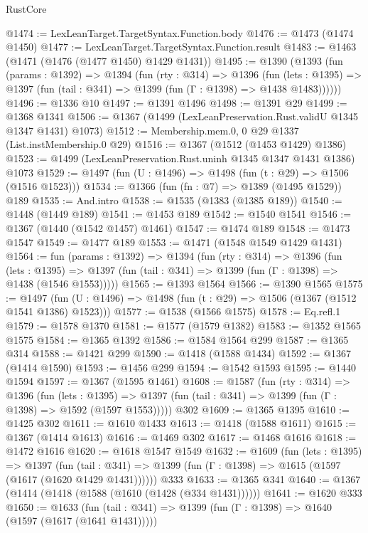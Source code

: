 \begin{lexlean}{RustCore}
\begin{coremodule}
@1474 := LexLeanTarget.TargetSyntax.Function.body
@1476 := @1473 (@1474 @1450)
@1477 := LexLeanTarget.TargetSyntax.Function.result
@1483 := @1463 (@1471 (@1476 (@1477 @1450) @1429 @1431))
@1495 := @1390
    (@1393
      (fun (params : @1392) =>
      @1394
        (fun (rty : @314) =>
        @1396
          (fun (lets : @1395) =>
          @1397 (fun (tail : @341) => @1399 (fun (Γ : @1398) => @1438 @1483))))))
@1496 := @1336 @10
@1497 := @1391 @1496
@1498 := @1391 @29
@1499 := @1368 @1341
@1506 := @1367 (@1499 (LexLeanPreservation.Rust.validU @1345 @1347 @1431) @1073)
@1512 := Membership.mem.{0, 0} @29 @1337 (List.instMembership.{0} @29)
@1516 := @1367 (@1512 (@1453 @1429) @1386)
@1523 := @1499 (LexLeanPreservation.Rust.uninh @1345 @1347 @1431 @1386) @1073
@1529 := @1497 (fun (U : @1496) => @1498 (fun (t : @29) => @1506 (@1516 @1523)))
@1534 := @1366 (fun (fn : @7) => @1389 (@1495 @1529)) @189
@1535 := And.intro
@1538 := @1535 (@1383 (@1385 @189))
@1540 := @1448 (@1449 @189)
@1541 := @1453 @189
@1542 := @1540 @1541
@1546 := @1367 (@1440 (@1542 @1457) @1461)
@1547 := @1474 @189
@1548 := @1473 @1547
@1549 := @1477 @189
@1553 := @1471 (@1548 @1549 @1429 @1431)
@1564 := fun (params : @1392) =>
  @1394
    (fun (rty : @314) =>
    @1396
      (fun (lets : @1395) =>
      @1397 (fun (tail : @341) => @1399 (fun (Γ : @1398) => @1438 (@1546 @1553)))))
@1565 := @1393 @1564
@1566 := @1390 @1565
@1575 := @1497 (fun (U : @1496) => @1498 (fun (t : @29) => @1506 (@1367 (@1512 @1541 @1386) @1523)))
@1577 := @1538 (@1566 @1575)
@1578 := Eq.refl.{1}
@1579 := @1578 @1370
@1581 := @1577 (@1579 @1382)
@1583 := @1352 @1565 @1575
@1584 := @1365 @1392
@1586 := @1584 @1564 @299
@1587 := @1365 @314
@1588 := @1421 @299
@1590 := @1418 (@1588 @1434)
@1592 := @1367 (@1414 @1590)
@1593 := @1456 @299
@1594 := @1542 @1593
@1595 := @1440 @1594
@1597 := @1367 (@1595 @1461)
@1608 := @1587
    (fun (rty : @314) =>
    @1396
      (fun (lets : @1395) =>
      @1397 (fun (tail : @341) => @1399 (fun (Γ : @1398) => @1592 (@1597 @1553)))))
    @302
@1609 := @1365 @1395
@1610 := @1425 @302
@1611 := @1610 @1433
@1613 := @1418 (@1588 @1611)
@1615 := @1367 (@1414 @1613)
@1616 := @1469 @302
@1617 := @1468 @1616
@1618 := @1472 @1616
@1620 := @1618 @1547 @1549
@1632 := @1609
    (fun (lets : @1395) =>
    @1397
      (fun (tail : @341) => @1399 (fun (Γ : @1398) => @1615 (@1597 (@1617 (@1620 @1429 @1431))))))
    @333
@1633 := @1365 @341
@1640 := @1367 (@1414 (@1418 (@1588 (@1610 (@1428 (@334 @1431))))))
@1641 := @1620 @333
@1650 := @1633
    (fun (tail : @341) => @1399 (fun (Γ : @1398) => @1640 (@1597 (@1617 (@1641 @1431)))))

\end{coremodule}
\end{lexlean}
